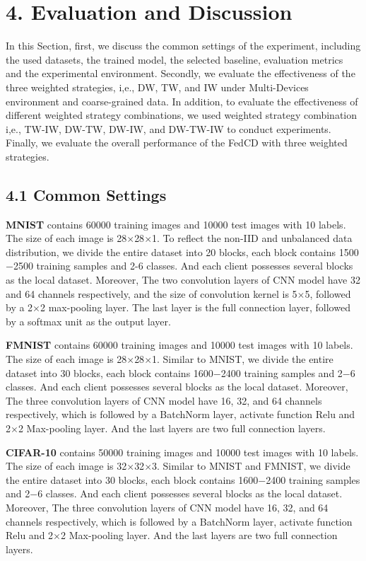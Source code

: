 \documentclass[twoside,twocolumn]{article}
\begin{document}
\section{4. Evaluation and Discussion}
In this Section, first, we discuss the common settings of the experiment, including the used datasets, the trained model, the selected baseline, evaluation metrics and the experimental environment. Secondly, we evaluate the effectiveness of the three weighted strategies, i,e., DW, TW, and IW under Multi-Devices environment and coarse-grained data. In addition, to evaluate the effectiveness of different weighted strategy combinations, we used weighted strategy combination i,e., TW-IW, DW-TW, DW-IW, and DW-TW-IW to conduct experiments. Finally, we evaluate the overall performance of the FedCD with three weighted strategies.
\subsection{4.1 Common Settings}
	\textbf{MNIST} contains 60000 training images and 10000 test images with 10 labels. The size of each image is 28$\times $28$\times $1. To reflect the non-IID and unbalanced data distribution, we divide the entire dataset into 20 blocks, each block contains 1500$-$2500 training samples and 2-6 classes. And each client possesses several blocks as the local dataset. Moreover, The two convolution layers of CNN model have 32 and 64 channels respectively, and the size of convolution kernel is 5$\times $5, followed by a 2$\times $2 max-pooling layer. The last layer is the full connection layer, followed by a softmax unit as the output layer.

	\textbf{FMNIST} contains 60000 training images and 10000 test images with 10 labels. The size of each image is 28$\times $28$\times $1. Similar to MNIST, we divide the entire dataset into 30 blocks, each block contains 1600$-$2400 training samples and 2$-$6 classes. And each client possesses several blocks as the local dataset. Moreover, The three convolution layers of CNN model have 16, 32, and 64 channels respectively, which is followed by a BatchNorm layer, activate function Relu and 2$\times $2 Max-pooling layer. And the last layers are two full connection layers.
	
	\textbf{CIFAR-10} contains 50000 training images and 10000 test images with 10 labels. The size of each image is 32$\times $32$\times $3. Similar to MNIST and FMNIST, we divide the entire dataset into 30 blocks, each block contains 1600$-$2400 training samples and 2$-$6 classes. And each client possesses several blocks as the local dataset. Moreover, The three convolution layers of CNN model have 16, 32, and 64 channels respectively, which is followed by a BatchNorm layer, activate function Relu and 2$\times $2 Max-pooling layer. And the last layers are two full connection layers.
\end{document}
